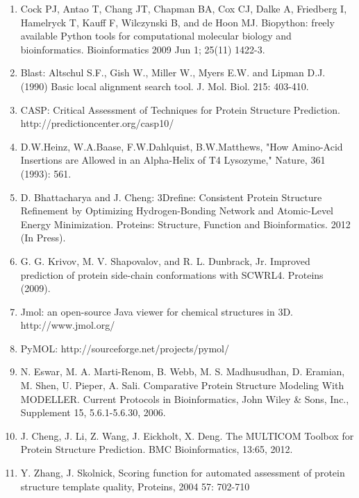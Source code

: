 \documentclass{article}
\begin{document}
\begin{enumerate}

\item Cock PJ, Antao T, Chang JT, Chapman BA, Cox CJ, Dalke A, Friedberg I, Hamelryck T, Kauff F, Wilczynski B, and de Hoon MJ. Biopython: freely available Python tools for computational molecular biology and bioinformatics. Bioinformatics 2009 Jun 1; 25(11) 1422-3.

\item Blast:  Altschul S.F., Gish W., Miller W., Myers E.W. and Lipman D.J. (1990)
Basic local alignment search tool.  J. Mol. Biol. 215: 403-410.

\item CASP: Critical Assessment of Techniques for Protein Structure Prediction. http://predictioncenter.org/casp10/

\item D.W.Heinz, W.A.Baase, F.W.Dahlquist, B.W.Matthews, "How Amino-Acid Insertions are Allowed in an Alpha-Helix of T4 Lysozyme," Nature, 361 (1993): 561.

\item D. Bhattacharya and J. Cheng: 3Drefine: Consistent Protein Structure Refinement by Optimizing Hydrogen-Bonding Network and Atomic-Level Energy Minimization.
Proteins: Structure, Function and Bioinformatics. 2012 (In Press).

\item G. G. Krivov, M. V. Shapovalov, and R. L. Dunbrack, Jr. Improved prediction of protein side-chain conformations with SCWRL4. Proteins (2009).

\item Jmol: an open-source Java viewer for chemical structures in 3D. http://www.jmol.org/ 

\item PyMOL: http://sourceforge.net/projects/pymol/

\item N. Eswar, M. A. Marti-Renom, B. Webb, M. S. Madhusudhan, D. Eramian, M. Shen, U. Pieper, A. Sali. Comparative Protein Structure Modeling With MODELLER. Current Protocols in Bioinformatics, John Wiley \& Sons, Inc., Supplement 15, 5.6.1-5.6.30, 2006.

\item J. Cheng, J. Li, Z. Wang, J. Eickholt, X. Deng. The MULTICOM Toolbox for Protein Structure Prediction. BMC Bioinformatics, 13:65, 2012.

\item Y. Zhang, J. Skolnick, Scoring function for automated assessment of protein structure template quality, Proteins, 2004 57: 702-710


\end{enumerate}
\end{document}
